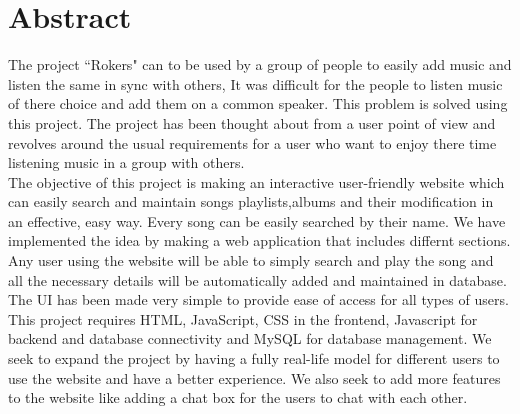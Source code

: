 \chapter*{Abstract}%
%
The project ``Rokers" can to be used by a group of people to easily add music and listen the same in sync with others, It was difficult for the people to listen music of there choice and add them on a common speaker. This problem is solved using this project. The project has been thought about from a user point of view and revolves around the usual requirements for a user who want to enjoy there time listening music in a group with others.
\\[10pt]

The objective of this project is making an interactive user-friendly website which can easily search and maintain songs playlists,albums and their modification in an effective, easy way. Every song can be easily searched by their name. We have implemented the idea by making a web application that includes differnt sections. Any user using the website will be able to simply search and play the song and all the necessary details will be automatically added and maintained in database. The UI has been made very simple to provide ease of access for all types of users.
\\[10pt]

This project requires HTML, JavaScript, CSS in the frontend, Javascript for backend and database connectivity and MySQL for database management. We seek to expand the project by having a fully real-life model for different users to use the website and have a better experience. We also seek to add more features to the website like adding a chat box for the users to chat with each other. 
\thispagestyle{plain}


